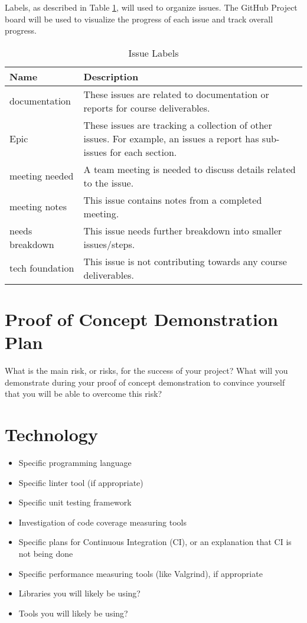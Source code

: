 \documentclass{article}
\begin{document}
Labels, as described in Table \ref{issueLabels}, will used to organize issues. The GitHub Project
board will be used to visualize the progress of each issue and track overall progress.

\begin{table}[H]
  \centering
  \caption{Issue Labels}
  \vspace{5pt}
  \begin{tabular}{|p{}|p{}|}
      \hline
      \textbf{Name} & \textbf{Description}\\
      \hline
      documentation & These issues are related to documentation or reports for course deliverables.\\
      \hline
      Epic & These issues are tracking a collection of other issues. For example, an issues a report
      has sub-issues for each section.\\
      \hline
      meeting needed & A team meeting is needed to discuss details related to the issue.\\
      \hline
      meeting notes & This issue contains notes from a completed meeting.\\
      \hline
      needs breakdown & This issue needs further breakdown into smaller issues/steps.\\
      \hline
      tech foundation & This issue is not contributing towards any course deliverables.\\
      \hline
  \end{tabular}

  \label{issueLabels}
\end{table}


\section{Proof of Concept Demonstration Plan}

What is the main risk, or risks, for the success of your project?  What will you
demonstrate during your proof of concept demonstration to convince yourself that
you will be able to overcome this risk?

\section{Technology}

\begin{itemize}
\item Specific programming language
\item Specific linter tool (if appropriate)
\item Specific unit testing framework
\item Investigation of code coverage measuring tools
\item Specific plans for Continuous Integration (CI), or an explanation that CI
  is not being done
\item Specific performance measuring tools (like Valgrind), if
  appropriate
\item Libraries you will likely be using?
\item Tools you will likely be using?
\end{itemize}
\end{document}
